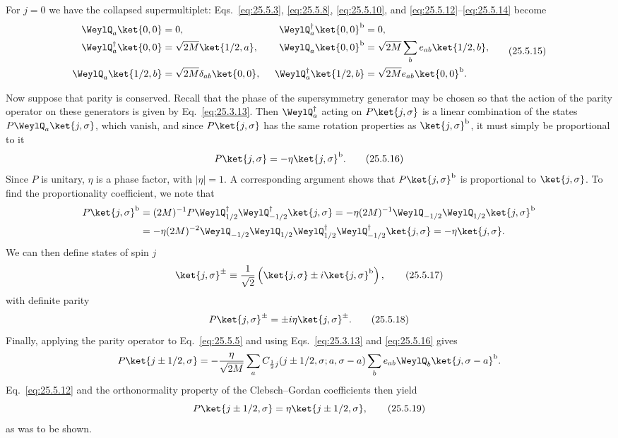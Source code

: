 For $j=0$ we have the collapsed supermultiplet:
Eqs.~\eqref{eq:25.5.3}, \eqref{eq:25.5.8}, \eqref{eq:25.5.10}, and
\eqref{eq:25.5.12}--\eqref{eq:25.5.14} become
\begin{equation}
\begin{alignedat}{2}
 \WeylQ_a\ket{0,0}&=0,
 &\qquad
 \WeylQ_a^\dagger\ket{0,0}^{\mathrm b}&=0,
 \\
 \WeylQ_a^\dagger\ket{0,0}&=\sqrt{2M}\ket{1/2,a},
 &
 \WeylQ_a\ket{0,0}^{\mathrm b}
 &=\sqrt{2M}\sum_b e_{ab}\ket{1/2,b},
 \\
 \WeylQ_a\ket{1/2,b}&=\sqrt{2M}\delta_{ab}\ket{0,0},
 &
 \WeylQ_a^\dagger\ket{1/2,b}
 &=\sqrt{2M}e_{ab}\ket{0,0}^{\mathrm b}.
\end{alignedat}
\tag{25.5.15}\label{eq:25.5.15}
\end{equation}

Now suppose that parity is conserved. Recall that the phase of the
supersymmetry generator may be chosen so that the action of the parity
operator on these generators is given by Eq.~\eqref{eq:25.3.13}. Then
$\WeylQ_a^\dagger$ acting on $P\ket{j,\sigma}$ is a linear combination of the
states $P\WeylQ_a\ket{j,\sigma}$, which vanish, and since
$P\ket{j,\sigma}$ has the same rotation properties as
$\ket{j,\sigma}^{\mathrm b}$, it must simply be proportional to it
\begin{equation}
 P\ket{j,\sigma}=-\eta\ket{j,\sigma}^{\mathrm b}.
\tag{25.5.16}\label{eq:25.5.16}
\end{equation}
Since $P$ is unitary, $\eta$ is a phase factor, with $|\eta|=1$. A
corresponding argument shows that $P\ket{j,\sigma}^{\mathrm b}$ is
proportional to $\ket{j,\sigma}$. To find the proportionality coefficient,
we note that
\[
\begin{aligned}
 P\ket{j,\sigma}^{\mathrm b}
 &=(2M)^{-1}P\WeylQ_{1/2}^\dagger
   \WeylQ_{-1/2}^\dagger\ket{j,\sigma}
 =-\eta(2M)^{-1}\WeylQ_{-1/2}\WeylQ_{1/2}
   \ket{j,\sigma}^{\mathrm b}
 \\
 &=-\eta(2M)^{-2}
   \WeylQ_{-1/2}\WeylQ_{1/2}
   \WeylQ_{1/2}^\dagger\WeylQ_{-1/2}^\dagger\ket{j,\sigma}
 =-\eta\ket{j,\sigma}.
\end{aligned}
\]
We can then define states of spin $j$
\begin{equation}
 \ket{j,\sigma}^{\pm}
 \equiv\frac{1}{\sqrt{2}}
 \left(\ket{j,\sigma}\pm i\ket{j,\sigma}^{\mathrm b}\right),
\tag{25.5.17}\label{eq:25.5.17}
\end{equation}
with definite parity
\begin{equation}
 P\ket{j,\sigma}^{\pm}=\pm i\eta\ket{j,\sigma}^{\pm}.
\tag{25.5.18}\label{eq:25.5.18}
\end{equation}
Finally, applying the parity operator to Eq.~\eqref{eq:25.5.5} and using
Eqs.~\eqref{eq:25.3.13} and \eqref{eq:25.5.16} gives
\[
 P\ket{j\pm1/2,\sigma}
 =-\frac{\eta}{\sqrt{2M}}\sum_a
 C_{\frac12 j}(j\pm1/2,\sigma;a,\sigma-a)
 \sum_b e_{ab}\WeylQ_b\ket{j,\sigma-a}^{\mathrm b}.
\]
Eq.~\eqref{eq:25.5.12} and the orthonormality property of the
Clebsch--Gordan coefficients then yield
\begin{equation}
 P\ket{j\pm1/2,\sigma}=\eta\ket{j\pm1/2,\sigma},
\tag{25.5.19}\label{eq:25.5.19}
\end{equation}
as was to be shown.

